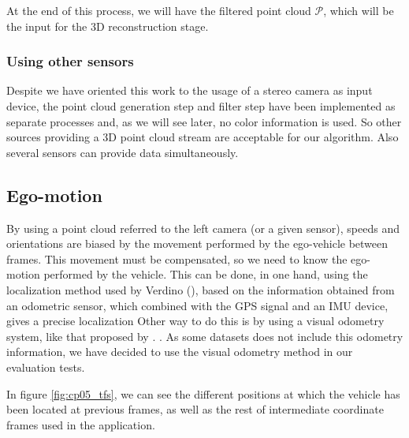 At the end of this process, we will have the filtered point cloud $\mathcal{P}$, which will be the input for the 3D reconstruction stage.

\subsubsection{Using other sensors}\label{ch:chapter05_01_01_02}

Despite we have oriented this work to the usage of a stereo camera as input device, the point cloud generation step and filter step have been implemented as separate processes and, as we will see later, no color information is used. So other sources providing a 3D point cloud stream are acceptable for our algorithm. Also several sensors can provide data simultaneously.

\subsection{Ego-motion}\label{ch:chapter05_01_02}

By using a point cloud referred to the left camera (or a given sensor), speeds and orientations are biased by the movement performed by the ego-vehicle between frames. This movement must be compensated, so we need to know the ego-motion performed by the vehicle. This can be done, in one hand, using the localization method used by Verdino (\cite{Perea2013mcl}), based on the information obtained from an odometric sensor, which combined with the \acf{GPS} signal and an \acf{IMU} device, gives a precise localization Other way to do this is by using a visual odometry system, like that proposed by \cite{geiger2011stereoscan}. . As some datasets does not include this odometry information, we have decided to use the visual odometry method in our evaluation tests.

In figure \ref{fig:cp05_tfs}, we can see the different positions at which the vehicle has been located at previous frames, as well as the rest of intermediate coordinate frames used in the application.

